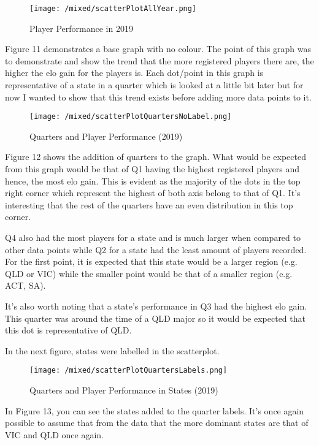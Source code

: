 \documentclass[11pt, oneside, a4paper]{article}
\begin{document}
\begin{figure}[!ht]
	\centerline{\texttt{[image: /mixed/scatterPlotAllYear.png]}}
	\caption{Player Performance in 2019}
	\label{fig:figure11}
\end{figure}
Figure 11 demonstrates a base graph with no colour. The point of this graph was to demonstrate and show the trend that the more registered players there are, the higher the elo gain for the players is. Each dot/point in this graph is representative of a state in a quarter which is looked at a little bit later but for now I wanted to show that this trend exists before adding more data points to it.

\newpage
\begin{figure}[!ht]
	\centerline{\texttt{[image: /mixed/scatterPlotQuartersNoLabel.png]}}
	\caption{Quarters and Player Performance (2019)}
	\label{fig:figure12}
\end{figure}

Figure 12 shows the addition of quarters to the graph. What would be expected from this graph would be that of Q1 having the highest registered players and hence, the most elo gain. This is evident as the majority of the dots in the top right corner which represent the highest of both axis belong to that of Q1. It's interesting that the rest of the quarters have an even distribution in this top corner. 

Q4 also had the most players for a state and is much larger when compared to other data points while Q2 for a state had the least amount of players recorded. For the first point, it is expected that this state would be a larger region (e.g. QLD or VIC) while the smaller point would be that of a smaller region (e.g. ACT, SA).

It's also worth noting that a state's performance in Q3 had the highest elo gain. This quarter was around the time of a QLD major so it would be expected that this dot is representative of QLD. 

In the next figure, states were labelled in the scatterplot.

\newpage
\begin{figure}[!ht]
	\centerline{\texttt{[image: /mixed/scatterPlotQuartersLabels.png]}}
	\caption{Quarters and Player Performance in States (2019)}
	\label{fig:figure13}
\end{figure}

In Figure 13, you can see the states added to the quarter labels. It's once again possible to assume that from the data that the more dominant states are that of VIC and QLD once again. 
\end{document}
